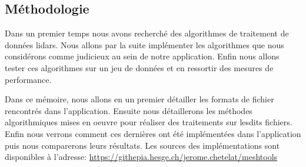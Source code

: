 \subsection*{Méthodologie}
Dans un premier temps nous avons recherché des algorithmes de
traitement de données lidars.
Nous allons par la suite implémenter les algorithmes que nous considérons comme judicieux au sein de notre application.
Enfin nous allons tester ces algorithmes sur un jeu de données et en ressortir des mesures
de performance.

Dans ce mémoire, nous allons en un premier détailler les formats de fichier 
rencontrés dans l'application.
Ensuite nous détaillerons les méthodes algorithmiques mises en oeuvre pour
réaliser des traitements sur lesdits fichiers.
Enfin nous verrons comment ces dernières ont été implémentées dans
l'application puis nous comparerons leurs résultats.
Les sources des implémentations sont disponibles à l'adresse: \href{https://githepia.esge.ch/jerome.chetelat/meshtools}{https://githepia.hesge.ch/jerome.chetelat/meshtools}
